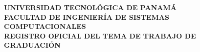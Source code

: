 \thispagestyle{empty}
\begin{minipage}{.1\textwidth} %
  \raggedright
\end{minipage}
\hfill
\begin{minipage}{.9\textwidth} %
  \raggedleft
  \centering
  \small{\bfseries
    UNIVERSIDAD TECNOLÓGICA DE PANAMÁ\\
    FACULTAD DE INGENIERÍA DE SISTEMAS COMPUTACIONALES\\
    REGISTRO OFICIAL DEL TEMA DE TRABAJO DE GRADUACIÓN
  }
\end{minipage}
